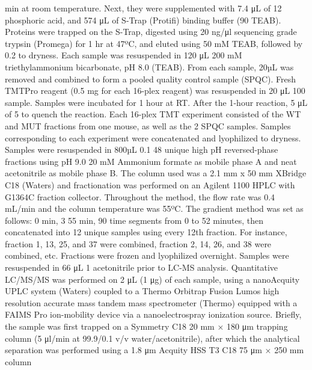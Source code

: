 min at room temperature. Next, they were supplemented with 7.4 μL of 12%
phosphoric acid, and 574 μL of S-Trap (Protifi) binding buffer (90%
TEAB). Proteins were trapped on the S-Trap, digested using 20 ng/μl sequencing
grade trypsin (Promega) for 1 hr at 47ºC, and eluted using 50 mM TEAB, followed
by 0.2%
to dryness.
Each sample was resuspended in 120 μL 200 mM triethylammonium bicarbonate, pH
8.0 (TEAB). From each sample, 20µL was removed and combined to form a pooled
quality control sample (SPQC). Fresh TMTPro reagent (0.5 mg for each 16-plex
reagent) was resuspended in 20 μL 100%
sample. Samples were incubated for 1 hour at RT. After the 1-hour reaction, 5 μL
of 5%
to quench the reaction. Each 16-plex TMT experiment consisted of the WT and MUT
fractions from one mouse, as well as the 2 SPQC samples. Samples corresponding
to each experiment were concatenated and lyophilized to dryness.
Samples were resuspended in 800µL 0.1%
48 unique high pH reversed-phase fractions using pH 9.0 20 mM Ammonium formate
as mobile phase A and neat acetonitrile as mobile phase B. The column used was a
2.1 mm x 50 mm XBridge C18 (Waters) and fractionation was performed on an
Agilent 1100 HPLC with G1364C fraction collector. Throughout the method, the
flow rate was 0.4 mL/min and the column temperature was 55ºC. The gradient
method was set as follows: 0 min, 3%
55 min, 90%
time segments from 0 to 52 minutes, then concatenated into 12 unique samples
using every 12th fraction. For instance, fraction 1, 13, 25, and 37 were
combined, fraction 2, 14, 26, and 38 were combined, etc. Fractions were frozen
and lyophilized overnight. Samples were resuspended in 66 μL 1%
acetonitrile prior to LC-MS analysis.
Quantitative LC/MS/MS was performed on 2 μL (1 μg) of each sample, using a
nanoAcquity UPLC system (Waters) coupled to a Thermo Orbitrap Fusion Lumos high
resolution accurate mass tandem mass spectrometer (Thermo) equipped with a FAIMS
Pro ion-mobility device via a nanoelectrospray ionization source. Briefly, the
sample was first trapped on a Symmetry C18 20 mm × 180 μm trapping column (5
μl/min at 99.9/0.1 v/v water/acetonitrile), after which the analytical
separation was performed using a 1.8 μm Acquity HSS T3 C18 75 μm × 250 mm column
